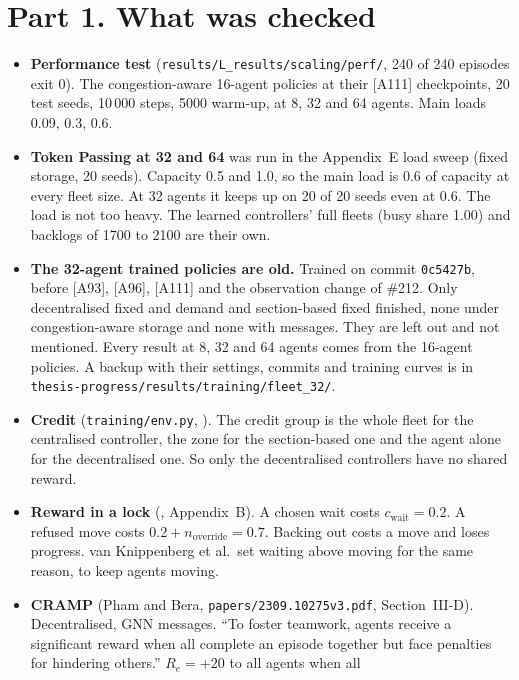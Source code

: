 \documentclass[11pt,a4paper]{article}
\newcommand{\lab}[1]{\textsf{\footnotesize\detokenize{#1}}}
\begin{document}
\section*{Part 1. What was checked}
\begin{itemize}[nosep]
  \item \textbf{Performance test} (\texttt{results/L\_results/scaling/perf/},
    240 of 240 episodes exit 0). The congestion-aware 16-agent policies at
    their [A111] checkpoints, 20 test seeds, 10\,000 steps, 5000 warm-up, at
    8, 32 and 64 agents. Main loads 0.09, 0.3, 0.6.
  \item \textbf{Token Passing at 32 and 64} was run in the Appendix~E load
    sweep (fixed storage, 20 seeds). Capacity 0.5 and 1.0, so the main load
    is 0.6 of capacity at every fleet size. At 32 agents it keeps up on 20 of
    20 seeds even at 0.6. The load is not too heavy. The learned controllers'
    full fleets (busy share 1.00) and backlogs of 1700 to 2100 are their own.
  \item \textbf{The 32-agent trained policies are old.} Trained on commit
    \texttt{0c5427b}, before [A93], [A96], [A111] and the observation change of
    \#212. Only decentralised fixed and demand and section-based fixed
    finished, none under congestion-aware storage and none with messages. They
    are left out and not mentioned. Every result at 8, 32 and 64 agents comes
    from the 16-agent policies. A backup with their settings, commits and
    training curves is in \texttt{thesis-progress/results/training/fleet\_32/}.
  \item \textbf{Credit} (\texttt{training/env.py}, \lab{eq:credit}). The
    credit group is the whole fleet for the centralised controller, the zone
    for the section-based one and the agent alone for the decentralised one.
    So only the decentralised controllers have no shared reward.
  \item \textbf{Reward in a lock} (\lab{eq:reward}, Appendix~B). A chosen
    wait costs $c_{\mathrm{wait}} = 0.2$. A refused move costs $0.2 +
    n_{\mathrm{override}} = 0.7$. Backing out costs a move and loses
    progress. van Knippenberg et al.\ set waiting above moving for the same
    reason, to keep agents moving.
  \item \textbf{CRAMP} (Pham and Bera, \texttt{papers/2309.10275v3.pdf},
    Section~III-D). Decentralised, GNN messages. ``To foster teamwork, agents
    receive a significant reward when all complete an episode together but
    face penalties for hindering others.'' $R_e = +20$ to all agents when all

\end{itemize}
\end{document}
